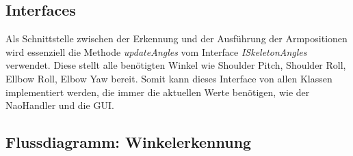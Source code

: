 %
%

\subsection{Interfaces}
Als Schnittstelle zwischen der Erkennung und der Ausführung der Armpositionen wird essenziell die Methode \textit{updateAngles} vom Interface \textit{ISkeletonAngles} verwendet. Diese stellt alle benötigten Winkel wie Shoulder Pitch, Shoulder Roll, Ellbow Roll, Elbow Yaw bereit. Somit kann dieses Interface von allen Klassen implementiert werden, die immer die aktuellen Werte benötigen, wie der NaoHandler und die GUI.


%
%
\subsection{Flussdiagramm: Winkelerkennung}



